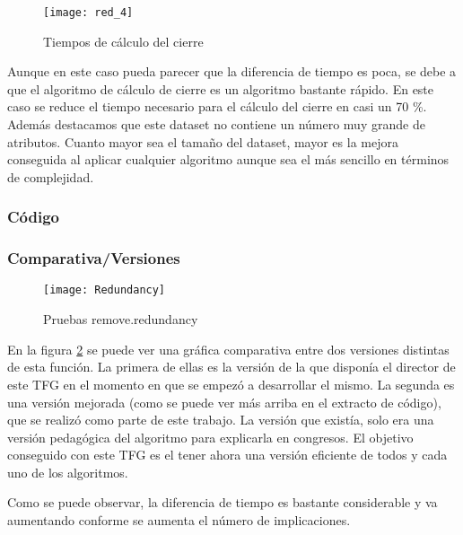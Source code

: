\begin{figure}[H]
    \centering
    \texttt{[image: red\_4]}
    \caption{Tiempos de c\'alculo del cierre}
    \label{fig:red_4}
\end{figure}

Aunque en este caso pueda parecer que la diferencia de tiempo es poca, se debe a que el algoritmo de c\'alculo de cierre es un algoritmo bastante r\'apido. En este caso se reduce el tiempo necesario para el c\'alculo del cierre en casi un 70 \%. Adem\'as destacamos que este dataset no contiene un n\'umero muy grande de atributos. Cuanto mayor sea el tama\~no del dataset, mayor es la mejora conseguida al aplicar cualquier algoritmo aunque sea el m\'as sencillo en t\'erminos de complejidad. 

\newpage
\subsubsection{C\'odigo} 

\newpage
 
\subsubsection{Comparativa/Versiones} 
\begin{figure}[h]
    \centering
    \texttt{[image: Redundancy]}
    \caption{Pruebas remove.redundancy}
    \label{fig:redundancy}
\end{figure} 

En la figura \ref{fig:redundancy} se puede ver una gr\'afica comparativa entre dos versiones distintas de esta funci\'on. La primera de ellas es la versi\'on de la que dispon\'ia el director de este TFG en el momento en que se empez\'o a desarrollar el mismo. La segunda es una versi\'on mejorada (como se puede ver m\'as arriba en el extracto de c\'odigo), que se realiz\'o como parte de este trabajo. La versi\'on que exist\'ia, solo era una versi\'on pedag\'ogica del algoritmo para explicarla en congresos. El objetivo conseguido con este TFG es el tener ahora una versi\'on eficiente de todos y cada uno de los algoritmos. 


Como se puede observar, la diferencia de tiempo es bastante considerable y va aumentando conforme se aumenta el n\'umero de implicaciones.